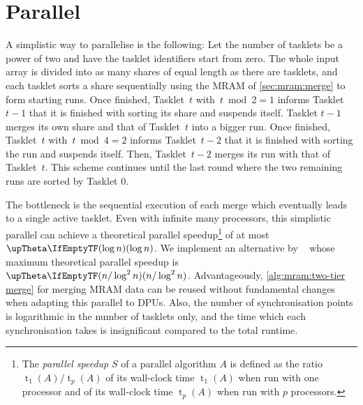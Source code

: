 \section{Parallel \texorpdfstring{\MS{}}{MergeSort}}
\label{sec:mram:par}

A simplistic way to parallelise \MS{} is the following:
Let the number of tasklets be a power of two and have the tasklet identifiers start from zero.
The whole input array is divided into as many shares of equal length as there are tasklets, and each tasklet sorts a share sequentially using the \ac{MRAM} \MS{} of \cref{sec:mram:merge} to form starting runs.
Once finished, Tasklet~\(t\) with~\(t \bmod 2 = 1\) informs Tasklet~\(t - 1\) that it is finished with sorting its share and suspends itself.
Tasklet \(t - 1\) merges its own share and that of Tasklet~\(t\) into a bigger run.
Once finished, Tasklet~\(t\) with~\(t \bmod 4 = 2\) informs Tasklet~\(t - 2\) that it is finished with sorting the run and suspends itself.
Then, Tasklet~\(t - 2\) merges its run with that of Tasklet~\(t\).
This scheme continues until the last round where the two remaining runs are sorted by Tasklet 0.

The bottleneck is the sequential execution of each merge which eventually leads to a single active tasklet.
Even with infinite many processors, this simplistic parallel \MS{} can achieve a theoretical parallel speedup\footnote{
	The \emph{parallel speedup} \(S\) of a parallel algorithm \(A\) is defined as the ratio \(\operatorname{t}_1(A) / \operatorname{t}_p(A)\) of its wall-clock time \(\operatorname{t}_1(A)\) when run with one processor and of its wall-clock time \(\operatorname{t}_p(A)\) when run with \(p\) processors.
} of at most \(\bigtheta{\log n}\).
We implement an alternative by \citeauthor{cormen2013algorithmen}~\cite{cormen2013algorithmen} whose maximum theoretical parallel speedup is \(\bigtheta{n / \log^2 n}\).
Advantageously, \cref{alg:mram:two-tier merge} for merging \ac{MRAM} data can be reused without fundamental changes when adapting this parallel \MS{} to \acp{DPU}.
Also, the number of synchronisation points is logarithmic in the number of tasklets only, and the time which each synchronisation takes is insignificant compared to the total runtime.




